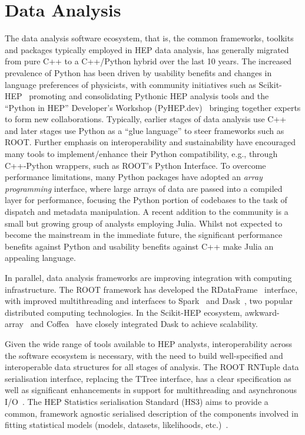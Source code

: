 \documentclass[10pt,a4paper]{article}
\begin{document}
\section{Data Analysis}\label{data-analysis}

The data analysis software ecosystem, that is, the common frameworks, toolkits
and packages typically employed in HEP data analysis, has generally migrated
from pure C++ to a C++/Python hybrid over the last 10 years. The increased
prevalence of Python has been driven by usability benefits and changes in
language preferences of physicists, with community initiatives such as
Scikit-HEP~\cite{Rodrigues_2020} promoting and consolidating Pythonic HEP
analysis tools and the ``Python in HEP'' Developer's Workshop
(PyHEP.dev)~\cite{alshehri2024pyhepdev2024workshopsummary} bringing together
experts to form new collaborations. Typically, earlier stages of data analysis
use C++ and later stages use Python as a ``glue language'' to steer frameworks
such as ROOT. Further emphasis on interoperability and sustainability have
encouraged many tools to implement/enhance their Python compatibility, e.g.,
through C++-Python wrappers, such as ROOT's Python Interface. To overcome
performance limitations, many Python packages have adopted an \emph{array
programming} interface, where large arrays of data are passed into a compiled
layer for performance, focusing the Python portion of codebases to the task of
dispatch and metadata manipulation. A recent addition to the community is a
small but growing group of analysts employing Julia. Whilst not expected to
become the mainstream in the immediate future, the significant performance
benefits against Python and usability benefits against C++ make Julia an
appealing language.

In parallel, data analysis frameworks are improving integration with computing
infrastructure. The ROOT framework has developed the
RDataFrame~\cite{ROOT:RDataFrame} interface, with improved
multithreading and interfaces to Spark~\cite{10.1145/2934664}
and Dask~\cite{matthew_rocklin-proc-scipy-2015}, two popular distributed
computing technologies. In the Scikit-HEP ecosystem,
awkward-array~\cite{Pivarski_2020} and Coffea~\cite{Smith_2020} have closely
integrated Dask to achieve scalability.

Given the wide range of tools available to HEP analysts, interoperability across
the software ecosystem is necessary, with the need to build well-specified and
interoperable data structures for all stages of analysis. The ROOT RNTuple data
serialisation interface, replacing the TTree interface, has a clear
specification as well as significant enhancements in support for multithreading
and asynchronous I/O~\cite{ROOT:RDataFrame_prod_path}. The
HEP Statistics serialisation Standard (HS3) aims to provide a common, framework
agnostic serialised description of the components involved in fitting
statistical models (models, datasets, likelihoods,
etc.)~\cite{HS3github}.
\end{document}
